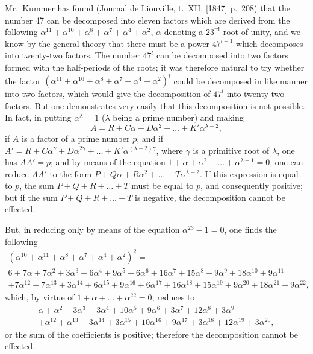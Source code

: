\documentclass[11pt,a4paper]{article}
\begin{document}
Mr.~Kummer has found (Journal de Liouville, t.~XII. [1847] p.~208) that the number 47 can be decomposed into eleven factors which are derived from the following $\alpha^{11}+\alpha^{10}+\alpha^8+\alpha^7+\alpha^4+\alpha^2$, $\alpha$ denoting a $23^{\text{rd}}$ root of unity, and we know by the general theory that there must be a power $47^{l-1}$ which decomposes into twenty-two factors. The number $47^l$ can be decomposed into two factors formed with the half-periods of the roots; it was therefore natural to try whether the factor $(\alpha^{11}+\alpha^{10}+\alpha^8+\alpha^7+\alpha^4+\alpha^2)^l$ could be decomposed in like manner into two factors, which would give the decomposition of $47^l$ into twenty-two factors. But one demonstrates very easily that this decomposition is not possible. In fact, in putting $\alpha^\lambda = 1$ ($\lambda$ being a prime number) and making
\[
A = R + C\alpha + D\alpha^2 + \ldots + K'\alpha^{\lambda-2},
\]
if $A$ is a factor of a prime number $p$, and if $A' = R + C\alpha^{\gamma} + D\alpha^{2\gamma} + \ldots + K'\alpha^{(\lambda-2)\gamma}$, where $\gamma$ is a primitive root of $\lambda$, one has $AA' = p$; and by means of the equation $1+\alpha+\alpha^2+\ldots+\alpha^{\lambda-1}=0$, one can reduce $AA'$ to the form $P + Q\alpha + R\alpha^2 + \ldots + T\alpha^{\lambda-2}$. If this expression is equal to $p$, the sum $P+Q+R+\ldots+T$ must be equal to $p$, and consequently positive; but if the sum $P+Q+R+\ldots+T$ is negative, the decomposition cannot be effected.

\setcounter{page}{72}

But, in reducing only by means of the equation $\alpha^{23}-1=0$, one finds the following
\begin{multline*}
(\alpha^{10} + \alpha^{11} + \alpha^8 + \alpha^7 + \alpha^4 + \alpha^2)^2 = \\
6 + 7\alpha + 7\alpha^2 + 3\alpha^3 + 6\alpha^4 + 9\alpha^5 + 6\alpha^6 + 16\alpha^7 + 15\alpha^8 + 9\alpha^9 + 18\alpha^{10} + 9\alpha^{11} \\
+ 7\alpha^{12} + 7\alpha^{13} + 3\alpha^{14} + 6\alpha^{15} + 9\alpha^{16} + 6\alpha^{17} + 16\alpha^{18} + 15\alpha^{19} + 9\alpha^{20} + 18\alpha^{21} + 9\alpha^{22},
\end{multline*}
which, by virtue of $1+\alpha+\ldots+\alpha^{22}=0$, reduces to
\begin{multline*}
\alpha + \alpha^2 - 3\alpha^3 + 3\alpha^4 + 10\alpha^5 + 9\alpha^6 + 3\alpha^7 + 12\alpha^8 + 3\alpha^9 \\
+ \alpha^{12} + \alpha^{13} - 3\alpha^{14} + 3\alpha^{15} + 10\alpha^{16} + 9\alpha^{17} + 3\alpha^{18} + 12\alpha^{19} + 3\alpha^{20},
\end{multline*}
or the sum of the coefficients is positive; therefore the decomposition cannot be effected.
\end{document}
